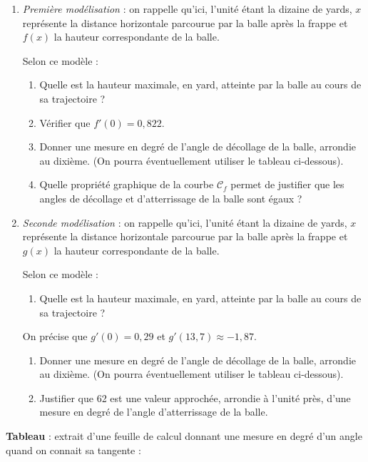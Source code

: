 \begin{enumerate}
	\item \textit{Première modélisation} : on rappelle qu’ici, l’unité étant la dizaine de yards, $x$ représente la distance horizontale parcourue par la balle après la frappe et $f(x)$ la hauteur correspondante de la balle.
	
	Selon ce modèle :
	\begin{enumerate}
		\item Quelle est la hauteur maximale, en yard, atteinte par la balle au cours de sa trajectoire ?
		\item Vérifier que $f'(0) = 0,822$.
		\item Donner une mesure en degré de l’angle de décollage de la balle, arrondie au dixième. (On pourra éventuellement utiliser le tableau ci-dessous).
		\item Quelle propriété graphique de la courbe $\mathcal{C}_f$ permet de justifier que les angles de décollage et d’atterrissage de la balle sont égaux ?
	\end{enumerate}
	\item \textit{Seconde modélisation} : on rappelle qu’ici, l’unité étant la dizaine de yards, $x$ représente la distance horizontale parcourue par la balle après la frappe et $g(x)$ la hauteur correspondante de la balle.
	
	Selon ce modèle :
	\begin{enumerate}
		\item Quelle est la hauteur maximale, en yard, atteinte par la balle au cours de sa trajectoire ?
	\end{enumerate}
	On précise que $g'(0) = 0,29$ et $g'(13,7) \approx -1,87$.
	\begin{enumerate}[resume]
		\item Donner une mesure en degré de l’angle de décollage de la balle, arrondie au dixième. (On pourra éventuellement utiliser le tableau ci-dessous).
		\item Justifier que 62 est une valeur approchée, arrondie à l’unité près, d’une mesure en degré de l’angle d’atterrissage de la balle.
	\end{enumerate}
\end{enumerate}

\textbf{Tableau} : extrait d’une feuille de calcul donnant une mesure en degré d’un angle quand on connait sa tangente :

